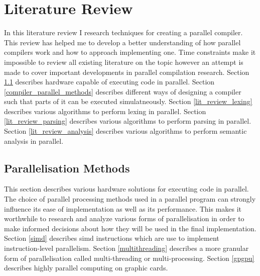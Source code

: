 \chapter{Literature Review} \label{litreview}

In this literature review I research techniques for creating a parallel
compiler. This review has helped me to develop a better understanding of how
parallel compilers work and how to approach implementing one. Time constraints
make it impossible to review all existing literature on the topic however
an attempt is made to cover important developments in parallel compilation
research.
\newline \newline
Section \ref{parallelisation_methods} describes hardware capable of executing
code in parallel.
\newline \newline
Section \ref{compiler_parallel_methods} describes different ways of designing a
compiler such that parts of it can be executed simulatneously.
\newline \newline
Section \ref{lit_review_lexing} describes various algorithms to perform lexing
in parallel.
\newline \newline
Section \ref{lit_review_parsing} describes various algorithms to perform parsing
in parallel.
\newline \newline
Section \ref{lit_review_analysis} describes various algorithms to perform semantic
analysis in parallel.
\newline \newline

\section{Parallelisation Methods} \label{parallelisation_methods}
This section describes various hardware solutions for executing code in
parallel. The choice of parallel processing methods used in a parallel
program can strongly influence its ease of implementation as well as its
performance. This makes it worthwhile to research and analyze various forms of
parallelisation in order to make informed decisions about how they will be used
in the final implementation.
\newline \newline
Section \ref{simd} describes \gls{simd} instructions which are use to  implement
instruction-level parallelism.
\newline \newline
Section \ref{multithreading} describes a more granular form of parallelisation
called multi-threading or multi-processing.
\newline \newline
Section \ref{gpgpu} describes highly parallel computing on graphic cards.

